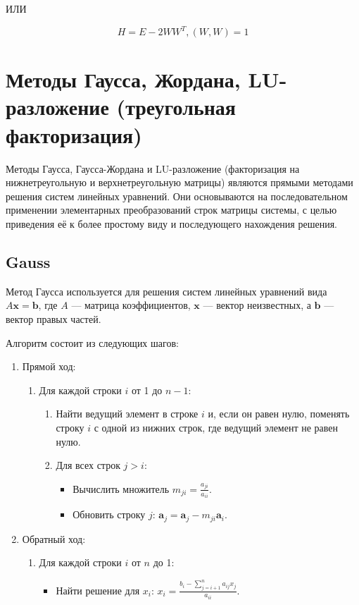 \documentclass{article}
\begin{document}
ИЛИ

$$H =  E - 2 W W^T, (W, W) = 1$$

\section{Методы Гаусса, Жордана, LU-разложение (треугольная факторизация)}
Методы Гаусса, Гаусса-Жордана и LU-разложение (факторизация на нижнетреугольную и верхнетреугольную матрицы) являются прямыми методами решения систем линейных уравнений. Они основываются на последовательном применении элементарных преобразований строк матрицы системы, с целью приведения её к более простому виду и последующего нахождения решения.

\subsection{Gauss}
Метод Гаусса используется для решения систем линейных уравнений вида \(A \mathbf{x} = \mathbf{b}\), где \(A\) — матрица коэффициентов, \(\mathbf{x}\) — вектор неизвестных, а \(\mathbf{b}\) — вектор правых частей.

Алгоритм состоит из следующих шагов:
\begin{enumerate}
    \item Прямой ход:
    \begin{enumerate}
        \item Для каждой строки \(i\) от 1 до \(n-1\):
        \begin{enumerate}
            \item Найти ведущий элемент в строке \(i\) и, если он равен нулю, поменять строку \(i\) с одной из нижних строк, где ведущий элемент не равен нулю.
            \item Для всех строк \(j > i\):
            \begin{itemize}
                \item Вычислить множитель \(m_{ji} = \frac{a_{ji}}{a_{ii}}\).
                \item Обновить строку \(j\): \(\mathbf{a}_j = \mathbf{a}_j - m_{ji} \mathbf{a}_i\).
            \end{itemize}
        \end{enumerate}
    \end{enumerate}
    \item Обратный ход:
    \begin{enumerate}
        \item Для каждой строки \(i\) от \(n\) до 1:
        \begin{itemize}
            \item Найти решение для \(x_i\): \(x_i = \frac{b_i - \sum_{j=i+1}^{n} a_{ij} x_j}{a_{ii}}\).
        \end{itemize}
    \end{enumerate}
\end{enumerate}
\end{document}
